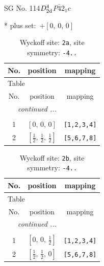 \documentclass[fleqn,8pt]{jsarticle}
\begin{document}
\setcounter{MaxMatrixCols}{32}

\renewcommand{\tablename}{Table~}
\renewcommand{\figurename}{Figure~}
\begin{center}
\LARGE
SG No. 114\quad$D_{\rm 2d}^{4}$\quad$P\bar{4}2_1c$\quad[ tetragonal ]
\end{center}
* plus set:\,\,\,$+\left[ 0,\, 0,\, 0 \right]$
\renewcommand{\arraystretch}{1.2}
\begin{longtable}{ccc}
\caption{Wyckoff site: {\tt 2a}, site symmetry: {\tt -4..}}
 \\
 \hline \hline
No. & position & mapping \\ \hline \endfirsthead

\multicolumn{2}{l}{\tablename\ \thetable{}} \\
 \hline \hline
No. & position & mapping \\ \hline \endhead

 \hline \hline
\multicolumn{2}{r}{\footnotesize\it continued ...} \\ \endfoot

 \hline \hline
\multicolumn{2}{r}{} \\ \endlastfoot

1 & $\left[ 0,\, 0,\, 0 \right]$ & {\tt [1,2,3,4]} \\ \hline
2 & $\left[ \frac{1}{2},\, \frac{1}{2},\, \frac{1}{2} \right]$ & {\tt [5,6,7,8]} \\
\end{longtable}
\renewcommand{\arraystretch}{1.2}
\begin{longtable}{ccc}
\caption{Wyckoff site: {\tt 2b}, site symmetry: {\tt -4..}}
 \\
 \hline \hline
No. & position & mapping \\ \hline \endfirsthead

\multicolumn{2}{l}{\tablename\ \thetable{}} \\
 \hline \hline
No. & position & mapping \\ \hline \endhead

 \hline \hline
\multicolumn{2}{r}{\footnotesize\it continued ...} \\ \endfoot

 \hline \hline
\multicolumn{2}{r}{} \\ \endlastfoot

1 & $\left[ 0,\, 0,\, \frac{1}{2} \right]$ & {\tt [1,2,3,4]} \\ \hline
2 & $\left[ \frac{1}{2},\, \frac{1}{2},\, 0 \right]$ & {\tt [5,6,7,8]} \\
\end{longtable}
\end{document}
